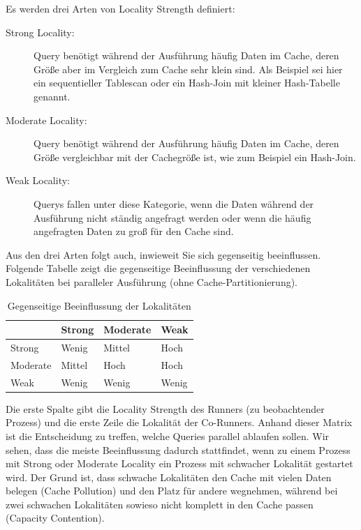 Es werden drei Arten von Locality Strength definiert:
\begin{description}
\item[Strong Locality:] Query benötigt während der Ausführung häufig Daten im Cache, deren Größe aber im Vergleich zum Cache sehr klein sind. Als Beispiel sei hier ein sequentieller Tablescan oder ein Hash-Join mit kleiner Hash-Tabelle genannt. 
\item[Moderate Locality:] Query benötigt während der Ausführung häufig Daten im Cache, deren Größe vergleichbar mit der Cachegröße ist, wie zum Beispiel ein Hash-Join.
\item[Weak Locality:] Querys fallen unter diese Kategorie, wenn die Daten während der Ausführung nicht ständig angefragt werden oder wenn die häufig angefragten Daten zu groß für den Cache sind.
\end{description}

Aus den drei Arten folgt auch, inwieweit Sie sich gegenseitig beeinflussen. Folgende Tabelle zeigt die gegenseitige Beeinflussung der verschiedenen Lokalitäten bei paralleler Ausführung (ohne Cache-Partitionierung).\\

\begin{table}[h]
	\centering
	\begin{tabular}{|l|l|l|l|} \hline
 & Strong & Moderate & Weak \\ \hline
Strong & Wenig & Mittel & Hoch \\ \hline
Moderate & Mittel & Hoch & Hoch \\ \hline
Weak & Wenig & Wenig & Wenig \\ \hline
	\end{tabular}
	\caption{Gegenseitige Beeinflussung der Lokalitäten}
\end{table}



Die erste Spalte gibt die Locality Strength des Runners (zu beobachtender Prozess) und die erste Zeile die Lokalität der Co-Runners. Anhand dieser Matrix ist die Entscheidung zu treffen, welche Queries parallel ablaufen sollen. Wir sehen, dass die meiste Beeinflussung dadurch stattfindet, wenn zu einem Prozess mit Strong oder Moderate Locality ein Prozess mit schwacher Lokalität gestartet wird.
Der Grund ist, dass schwache Lokalitäten den Cache mit vielen Daten belegen (Cache Pollution) und den Platz für andere wegnehmen, während bei zwei schwachen Lokalitäten sowieso nicht komplett in den Cache passen (Capacity Contention).

